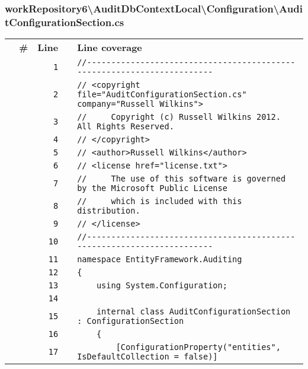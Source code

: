 \documentclass[a4paper,10pt]{article}
\begin{document}
\subsubsection{workRepository6\textbackslash AuditDbContextLocal\textbackslash Configuration\textbackslash AuditConfigurationSection.cs}
\begin{longtable}[l]{lrrll}
\textbf{} & \textbf{\#} & \textbf{Line} & \textbf{} & \textbf{Line coverage}\\
\cellcolor{gray} &  & \verb~1~ & & \verb~//-----------------------------------------------------------------------~\\
\cellcolor{gray} &  & \verb~2~ & & \verb~// <copyright file="AuditConfigurationSection.cs" company="Russell Wilkins">~\\
\cellcolor{gray} &  & \verb~3~ & & \verb~//     Copyright (c) Russell Wilkins 2012. All Rights Reserved.~\\
\cellcolor{gray} &  & \verb~4~ & & \verb~// </copyright>~\\
\cellcolor{gray} &  & \verb~5~ & & \verb~// <author>Russell Wilkins</author>~\\
\cellcolor{gray} &  & \verb~6~ & & \verb~// <license href="license.txt">~\\
\cellcolor{gray} &  & \verb~7~ & & \verb~//     The use of this software is governed by the Microsoft Public License~\\
\cellcolor{gray} &  & \verb~8~ & & \verb~//     which is included with this distribution.~\\
\cellcolor{gray} &  & \verb~9~ & & \verb~// </license>~\\
\cellcolor{gray} &  & \verb~10~ & & \verb~//-----------------------------------------------------------------------~\\
\cellcolor{gray} &  & \verb~11~ & & \verb~namespace EntityFramework.Auditing~\\
\cellcolor{gray} &  & \verb~12~ & & \verb~{~\\
\cellcolor{gray} &  & \verb~13~ & & \verb~    using System.Configuration;~\\
\cellcolor{gray} &  & \verb~14~ & & \verb~~\\
\cellcolor{gray} &  & \verb~15~ & & \verb~    internal class AuditConfigurationSection : ConfigurationSection~\\
\cellcolor{gray} &  & \verb~16~ & & \verb~    {~\\
\cellcolor{gray} &  & \verb~17~ & & \verb~        [ConfigurationProperty("entities", IsDefaultCollection = false)]~\\

\end{longtable}
\end{document}
